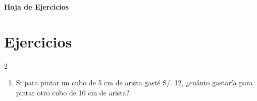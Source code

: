\documentclass[10pt]{article}
\begin{document}
	\begin{center}
		\Large\bfseries Hoja de Ejercicios
	\end{center}

		\section*{Ejercicios}
\begin{multicols}{2}
		\begin{enumerate}[label=\textbf{\arabic*.}, itemsep=0.4cm]
			\item Si para pintar un cubo de 5 cm de arista gasté S/.
			12, ¿cuánto gastaría para pintar otro cubo de 10
			cm de arista?


		\end{enumerate}

\end{multicols}
\end{document}

